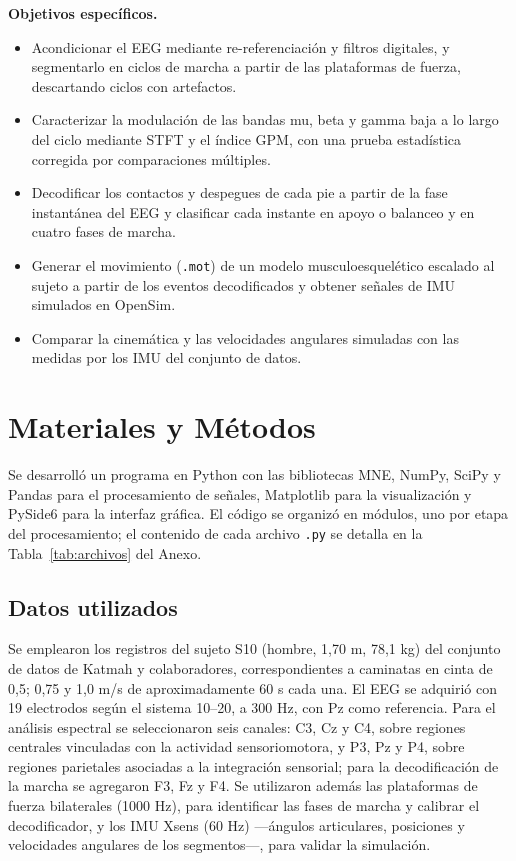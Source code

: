 \documentclass[10pt]{article}
\begin{document}
\textbf{Objetivos específicos.}
\begin{itemize}
    \setlength{\itemsep}{0pt}
    \item Acondicionar el EEG mediante re-referenciación y filtros digitales, y segmentarlo en ciclos de marcha a partir de las plataformas de fuerza, descartando ciclos con artefactos.
    \item Caracterizar la modulación de las bandas mu, beta y gamma baja a lo largo del ciclo mediante STFT y el índice GPM, con una prueba estadística corregida por comparaciones múltiples.
    \item Decodificar los contactos y despegues de cada pie a partir de la fase instantánea del EEG y clasificar cada instante en apoyo o balanceo y en cuatro fases de marcha.
    \item Generar el movimiento (\texttt{.mot}) de un modelo musculoesquelético escalado al sujeto a partir de los eventos decodificados y obtener señales de IMU simulados en OpenSim.
    \item Comparar la cinemática y las velocidades angulares simuladas con las medidas por los IMU del conjunto de datos.
\end{itemize}


\section{Materiales y Métodos}

Se desarrolló un programa en Python con las bibliotecas MNE, NumPy, SciPy y Pandas para el procesamiento de señales, Matplotlib para la visualización y PySide6 para la interfaz gráfica. El código se organizó en módulos, uno por etapa del procesamiento; el contenido de cada archivo \texttt{.py} se detalla en la Tabla~\ref{tab:archivos} del Anexo.

\subsection{Datos utilizados}

Se emplearon los registros del sujeto S10 (hombre, 1,70 m, 78,1 kg) del conjunto de datos de Katmah y colaboradores, correspondientes a caminatas en cinta de 0,5; 0,75 y 1,0 m/s de aproximadamente 60 s cada una. El EEG se adquirió con 19 electrodos según el sistema 10--20, a 300 Hz, con Pz como referencia. Para el análisis espectral se seleccionaron seis canales: C3, Cz y C4, sobre regiones centrales vinculadas con la actividad sensoriomotora, y P3, Pz y P4, sobre regiones parietales asociadas a la integración sensorial; para la decodificación de la marcha se agregaron F3, Fz y F4. Se utilizaron además las plataformas de fuerza bilaterales (1000 Hz), para identificar las fases de marcha y calibrar el decodificador, y los IMU Xsens (60 Hz) ---ángulos articulares, posiciones y velocidades angulares de los segmentos---, para validar la simulación.
\end{document}
